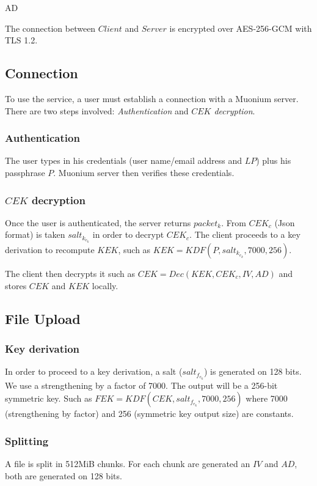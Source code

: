 AD\documentclass[a4paper,10pt]{article}
\begin{document}
The connection between $Client$ and $Server$ is encrypted over AES-256-GCM with TLS 1.2.

\subsection{Connection}
To use the service, a user must establish a connection with a Muonium server.
There are two steps involved: \emph{Authentication} and \emph{$CEK$ decryption}.

\subsubsection{Authentication}
The user types in his credentials (user name/email address and $LP$) plus his passphrase $P$. Muonium server then verifies these credentials.

\subsubsection{$CEK$ decryption}

Once the user is authenticated, the server returns $packet_k$. From $CEK_c$ (Json format) is taken $salt_k_e_k$ in order to decrypt $CEK_c$.
The client proceeds to a key derivation to recompute $KEK$, such as $KEK=KDF(P, salt_k_e_k, 7000, 256)$.

The client then decrypts it such as $CEK=Dec(KEK, CEK_c, IV, AD)$ and stores $CEK$ and $KEK$ locally.

\subsection{File Upload}
\subsubsection{Key derivation}
In order to proceed to a key derivation, a salt ($salt_f_e_k$) is generated on 128 bits.
We use a strengthening by a factor of 7000. The output will be a 256-bit symmetric key.
Such as $FEK = KDF(CEK, salt_f_e_k, 7000, 256)$ where 7000 (strengthening by factor)
and 256 (symmetric key output size) are constants.

\subsubsection{Splitting}
A file is split in 512MiB chunks. For each chunk are generated an $IV$
and $AD$, both are generated on 128 bits.
\end{document}
